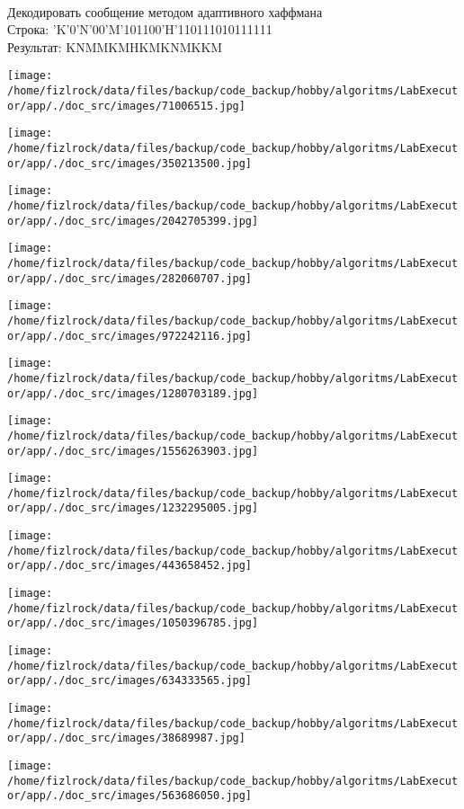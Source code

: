 \documentclass[a4paper, 12pt]{article}
\begin{document}
\\ 

Декодировать сообщение методом адаптивного хаффмана \\
Строка: 
'K'0'N'00'M'101100'H'110111010111111\\
Результат: KNMMKMHKMKNMKKM

\texttt{[image: /home/fizlrock/data/files/backup/code\_backup/hobby/algoritms/LabExecutor/app/./doc\_src/images/71006515.jpg]}

\texttt{[image: /home/fizlrock/data/files/backup/code\_backup/hobby/algoritms/LabExecutor/app/./doc\_src/images/350213500.jpg]}

\texttt{[image: /home/fizlrock/data/files/backup/code\_backup/hobby/algoritms/LabExecutor/app/./doc\_src/images/2042705399.jpg]}

\texttt{[image: /home/fizlrock/data/files/backup/code\_backup/hobby/algoritms/LabExecutor/app/./doc\_src/images/282060707.jpg]}

\texttt{[image: /home/fizlrock/data/files/backup/code\_backup/hobby/algoritms/LabExecutor/app/./doc\_src/images/972242116.jpg]}

\texttt{[image: /home/fizlrock/data/files/backup/code\_backup/hobby/algoritms/LabExecutor/app/./doc\_src/images/1280703189.jpg]}

\texttt{[image: /home/fizlrock/data/files/backup/code\_backup/hobby/algoritms/LabExecutor/app/./doc\_src/images/1556263903.jpg]}

\texttt{[image: /home/fizlrock/data/files/backup/code\_backup/hobby/algoritms/LabExecutor/app/./doc\_src/images/1232295005.jpg]}

\texttt{[image: /home/fizlrock/data/files/backup/code\_backup/hobby/algoritms/LabExecutor/app/./doc\_src/images/443658452.jpg]}

\texttt{[image: /home/fizlrock/data/files/backup/code\_backup/hobby/algoritms/LabExecutor/app/./doc\_src/images/1050396785.jpg]}

\texttt{[image: /home/fizlrock/data/files/backup/code\_backup/hobby/algoritms/LabExecutor/app/./doc\_src/images/634333565.jpg]}

\texttt{[image: /home/fizlrock/data/files/backup/code\_backup/hobby/algoritms/LabExecutor/app/./doc\_src/images/38689987.jpg]}

\texttt{[image: /home/fizlrock/data/files/backup/code\_backup/hobby/algoritms/LabExecutor/app/./doc\_src/images/563686050.jpg]}
\end{document}
